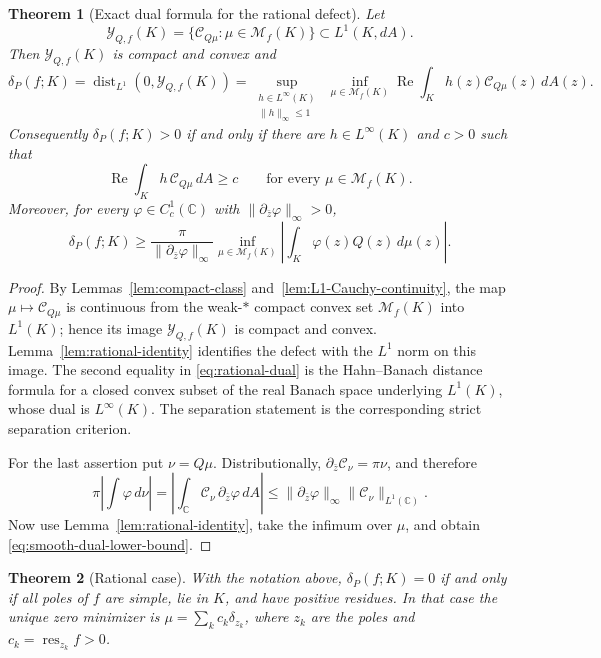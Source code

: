 \documentclass[reqno]{amsart}
\newtheorem{theorem}{Theorem}[section]
\theoremstyle{definition}
\theoremstyle{remark}
\newcommand{\bC}{\mathbb C}
\newcommand{\M}{\mathcal M}
\newcommand{\Cauchy}{\mathcal C}
\renewcommand{\Re}{\operatorname{Re}}
\begin{document}
\begin{theorem}[Exact dual formula for the rational defect]
\label{thm:rational-dual}
Let
\[
 \mathcal Y_{Q,f}(K)
 =\{\Cauchy_{Q\mu}:\mu\in\M_f(K)\}\subset L^1(K,dA).
\]
Then $\mathcal Y_{Q,f}(K)$ is compact and convex and
\begin{equation}\label{eq:rational-dual}
 \delta_P(f;K)
 =\operatorname{dist}_{L^1}(0,\mathcal Y_{Q,f}(K))
 =\sup_{\substack{h\in L^\infty(K)\\ \|h\|_\infty\leq1}}
   \ \inf_{\mu\in\M_f(K)}
   \Re\int_K h(z)\Cauchy_{Q\mu}(z)\,dA(z).
\end{equation}
Consequently $\delta_P(f;K)>0$ if and only if there are
$h\in L^\infty(K)$ and $c>0$ such that
\[
 \Re\int_K h\,\Cauchy_{Q\mu}\,dA\geq c
 \qquad\text{for every }\mu\in\M_f(K).
\]
Moreover, for every $\varphi\in C_c^1(\bC)$ with
$\|\partial_{\bar z}\varphi\|_\infty>0$,
\begin{equation}\label{eq:smooth-dual-lower-bound}
 \delta_P(f;K)
 \geq
 \frac{\pi}{\|\partial_{\bar z}\varphi\|_\infty}
 \inf_{\mu\in\M_f(K)}
 \left|\int_K \varphi(z)Q(z)\,d\mu(z)\right|.
\end{equation}
\end{theorem}

\begin{proof}
By Lemmas~\ref{lem:compact-class} and~\ref{lem:L1-Cauchy-continuity}, the map
$\mu\mapsto\Cauchy_{Q\mu}$ is continuous from the weak-$*$ compact convex set
$\M_f(K)$ into $L^1(K)$; hence its image $\mathcal Y_{Q,f}(K)$ is compact and
convex.  Lemma~\ref{lem:rational-identity} identifies the defect with the
$L^1$ norm on this image.  The second equality in
\eqref{eq:rational-dual} is the Hahn--Banach distance formula for a closed
convex subset of the real Banach space underlying $L^1(K)$, whose dual is
$L^\infty(K)$.  The separation statement is the corresponding strict
separation criterion.

For the last assertion put $\nu=Q\mu$.  Distributionally,
$\partial_{\bar z}\Cauchy_\nu=\pi\nu$, and therefore
\[
 \pi\left|\int\varphi\,d\nu\right|
 =\left|\int_{\bC}\Cauchy_\nu\,
        \partial_{\bar z}\varphi\,dA\right|
 \leq \|\partial_{\bar z}\varphi\|_\infty
       \|\Cauchy_\nu\|_{L^1(\bC)}.
\]
Now use Lemma~\ref{lem:rational-identity}, take the infimum over $\mu$, and
obtain \eqref{eq:smooth-dual-lower-bound}.
\end{proof}

\begin{theorem}[Rational case]\label{thm:rational}
With the notation above, $\delta_P(f;K)=0$ if and only if all poles of $f$ are
simple, lie in $K$, and have positive residues.  In that case the unique zero
minimizer is $\mu=\sum_k c_k\delta_{z_k}$, where $z_k$ are the poles and
$c_k=\operatorname{res}_{z_k}f>0$.
\end{theorem}
\end{document}
